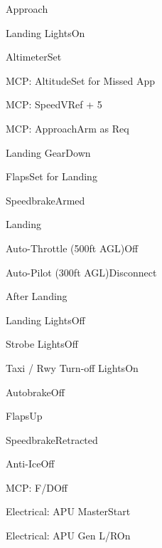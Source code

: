 \documentclass[sim-use]{checklist}
\begin{document}
\begin{checklist}{Approach}
  \item{Landing Lights}{On}
  \item{Altimeter}{Set}
  \item{MCP: Altitude}{Set for Missed App}
  \item{MCP: Speed}{VRef + 5}
  \item{MCP: Approach}{Arm as Req}
  \item{Landing Gear}{Down}
  \item{Flaps}{Set for Landing}
  \item{Speedbrake}{Armed} 
\end{checklist}

\begin{checklist}{Landing}
  \item{Auto-Throttle (500ft AGL)}{Off}
  \item{Auto-Pilot (300ft AGL)}{Disconnect}
\end{checklist}

\begin{checklist}{After Landing}
  \item{Landing Lights}{Off}
  \item{Strobe Lights}{Off}
  \item{Taxi / Rwy Turn-off Lights}{On}
  \item{Autobrake}{Off}
  \item{Flaps}{Up}
  \item{Speedbrake}{Retracted}
  \item{Anti-Ice}{Off}
  \item{MCP: F/D}{Off}
  \item{Electrical: APU Master}{Start}
  \item{Electrical: APU Gen L/R}{On}
\end{checklist}
\end{document}
